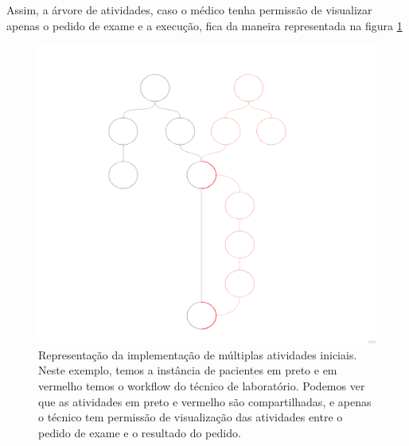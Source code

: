 Assim, a árvore de atividades, caso o médico tenha permissão de visualizar apenas o pedido de exame e a execução, fica da maneira representada na figura \ref{fig:segunda_implementacao}

\begin{figure}
    \centering
    \includegraphics[width=1\textwidth]{imgs/Implementacoes/segundaImplementacao.png}
    \caption{Representação da implementação de múltiplas atividades iniciais. Neste exemplo, temos a instância de pacientes em preto e em vermelho temos o workflow do técnico de laboratório. Podemos ver que as atividades em preto e vermelho são compartilhadas, e apenas o técnico tem permissão de visualização das atividades entre o pedido de exame e o resultado do pedido.}
    \label{fig:segunda_implementacao}
\end{figure}

